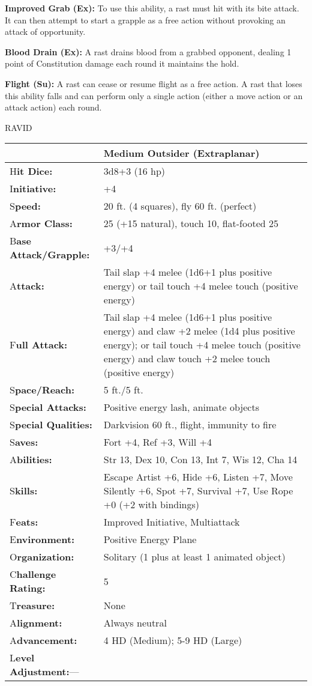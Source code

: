 \documentclass{article}
\begin{document}
\textbf{Improved Grab (Ex): }To use this ability, a rast must hit with its bite 
attack. It can then attempt to start a grapple as a free action without provoking 
an attack of opportunity.

\textbf{Blood Drain (Ex): }A rast drains blood from a grabbed opponent, dealing 
1 point of Constitution damage each round it maintains the hold.

\textbf{Flight (Su): }A rast can cease or resume flight as a free action. A rast 
that loses this ability falls and can perform only a single action (either a move 
action or an attack action) each round.

\vspace{12pt}
{\LARGE{}RAVID}

\begin{tabular}{|>{\raggedright}p{91pt}|>{\raggedright}p{186pt}|}
\hline
  & Medium Outsider (Extraplanar)\tabularnewline
\hline
H\textbf{it Dice:} & 3d8+3 (16 hp)\tabularnewline
\hline
I\textbf{nitiative:} & +4\tabularnewline
\hline
S\textbf{peed:} & 20 ft. (4 squares), fly 60 ft. (perfect)\tabularnewline
\hline
A\textbf{rmor Class:} & 25 (+15 natural), touch 10, flat-footed 25\tabularnewline
\hline
B\textbf{ase Attack/Grapple:} & +3/+4\tabularnewline
\hline
A\textbf{ttack:} & Tail slap +4 melee (1d6+1 plus positive energy) or tail touch 
+4 melee touch (positive energy)\tabularnewline
\hline
F\textbf{ull Attack:} & Tail slap +4 melee (1d6+1 plus positive energy) and claw 
+2 melee (1d4 plus positive energy); or tail touch +4 melee touch (positive energy) 
and claw touch +2 melee touch (positive energy)\tabularnewline
\hline
S\textbf{pace/Reach:} & 5 ft./5 ft.\tabularnewline
\hline
S\textbf{pecial Attacks:} & Positive energy lash, animate objects\tabularnewline
\hline
S\textbf{pecial Qualities:} & Darkvision 60 ft., flight, immunity to fire\tabularnewline
\hline
S\textbf{aves:} & Fort +4, Ref +3, Will +4\tabularnewline
\hline
A\textbf{bilities:} & Str 13, Dex 10, Con 13, Int 7, Wis 12, Cha 14\tabularnewline
\hline
S\textbf{kills:} & Escape Artist +6, Hide +6, Listen +7, Move Silently +6, Spot 
+7, Survival +7, Use Rope +0 (+2 with bindings)\tabularnewline
\hline
F\textbf{eats:} & Improved Initiative, Multiattack\tabularnewline
\hline
E\textbf{nvironment:} & Positive Energy Plane\tabularnewline
\hline
O\textbf{rganization:} & Solitary (1 plus at least 1 animated object)\tabularnewline
\hline
C\textbf{hallenge Rating:} & 5\tabularnewline
\hline
T\textbf{reasure:} & None\tabularnewline
\hline
A\textbf{lignment:} & Always neutral\tabularnewline
\hline
A\textbf{dvancement:} & 4 HD (Medium); 5-9 HD (Large)\tabularnewline
\hline
L\textbf{evel Adjustment:}--- & \tabularnewline
\hline
\end{tabular}
\end{document}
